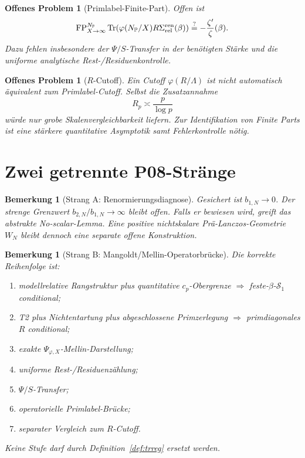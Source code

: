 \documentclass[11pt,a4paper]{amsart}
\newtheorem{remark}[theorem]{Bemerkung}
\newtheorem{openproblem}[theorem]{Offenes Problem}
\newcommand{\Tr}{\operatorname{Tr}}
\newcommand{\FP}{\operatorname{FP}}
\begin{document}
\begin{openproblem}[Primlabel-Finite-Part]\label{op:np-fp}
Offen ist
\[
  \FP_{X\to\infty}^{N_{\mathbb P}}
  \Tr\!\left(
    \varphi(N_{\mathbb P}/X)R\Sigma_{\rm rel}^{\rm ren}(\beta)
  \right)
  \stackrel?=-\frac{\zeta'}{\zeta}(\beta).
\]
Dazu fehlen insbesondere der $\Psi/S$-Transfer in der benötigten Stärke und
die uniforme analytische Rest-/Residuenkontrolle.
\end{openproblem}

\begin{openproblem}[$R$-Cutoff]\label{op:r-cutoff}
Ein Cutoff $\varphi(R/\Lambda)$ ist nicht automatisch äquivalent zum
Primlabel-Cutoff. Selbst die Zusatzannahme
\[
  R_p\asymp\frac{p}{\log p}
\]
würde nur grobe Skalenvergleichbarkeit liefern. Zur Identifikation von
Finite Parts ist eine stärkere quantitative Asymptotik samt Fehlerkontrolle
nötig.
\end{openproblem}

\section{Zwei getrennte P08-Stränge}

\begin{remark}[Strang A: Renormierungsdiagnose]\label{rem:strand-a}
Gesichert ist $b_{1,N}\to0$. Der strenge Grenzwert
$b_{2,N}/b_{1,N}\to\infty$ bleibt offen. Falls er bewiesen wird, greift das
abstrakte No-scalar-Lemma. Eine positive nichtskalare Prä-Lanczos-Geometrie
$W_N$ bleibt dennoch eine separate offene Konstruktion.
\end{remark}

\begin{remark}[Strang B: Mangoldt/Mellin-Operatorbrücke]
\label{rem:strand-b}
Die korrekte Reihenfolge ist:
\begin{enumerate}
  \item modellrelative Rangstruktur plus quantitative $c_p$-Obergrenze
        $\Rightarrow$ feste-$\beta$-$\mathcal S_1$ conditional;
  \item T2 plus Nichtentartung plus abgeschlossene Primzerlegung
        $\Rightarrow$ primdiagonales $R$ conditional;
  \item exakte $\Psi_{\varphi,X}$-Mellin-Darstellung;
  \item uniforme Rest-/Residuenzählung;
  \item $\Psi/S$-Transfer;
  \item operatorielle Primlabel-Brücke;
  \item separater Vergleich zum $R$-Cutoff.
\end{enumerate}
Keine Stufe darf durch Definition~\ref{def:trreg} ersetzt werden.
\end{remark}
\end{document}
